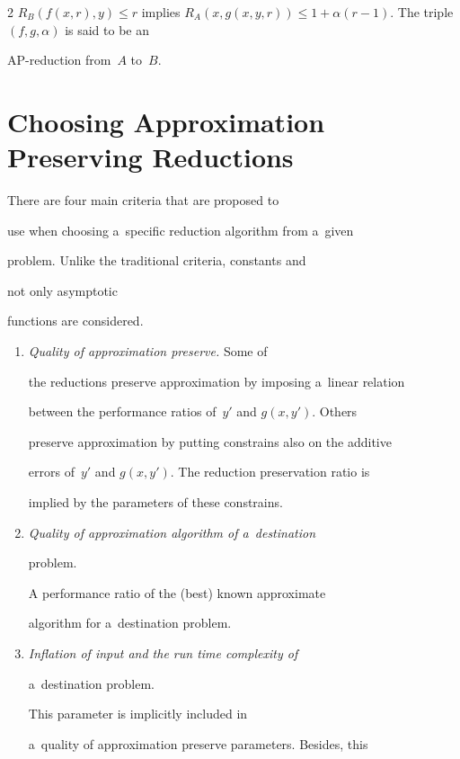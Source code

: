 \begin{multicols}{2}
$R_{B}(f(x,r),y) \leq r$ implies $R_{A}(x,g(x,y,r)) \leq 1 +


\alpha(r-1)$. The triple $(f,g,\alpha)$ is said to be an


AP-reduction from~$A$ to~$B$.





\section{Choosing Approximation Preserving Reductions}


\label{s:ChoosRed}





\noindent


There are four main criteria that are proposed to


use when choosing a~specific reduction algorithm from a~given


problem. Unlike the traditional criteria,  constants and


not only asymptotic


functions are considered.


\begin{enumerate}[1.]


\item {\it Quality of approximation preserve.} Some of


the reductions preserve approximation by imposing a~linear relation


between the performance ratios of~$y'$ and $g(x,y')$. Others


preserve approximation by putting constrains also on the additive


errors of~$y'$ and $g(x,y')$. The reduction preservation ratio is


implied by the parameters of these constrains.


\item {\it Quality of approximation algorithm of a~destination


problem.} A performance ratio of the (best) known approximate


algorithm for a~destination problem.


\item {\it Inflation of input and the run time complexity of


a~destination problem.} This parameter is implicitly included in


a~quality of approximation preserve parameters. Besides, this



\end{enumerate}
\end{multicols}
